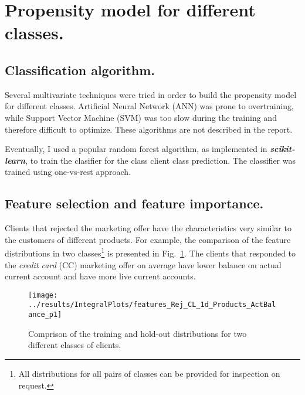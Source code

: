 \documentclass[14pt]{scrartcl}
\begin{document}
\section{Propensity model for different classes.}\label{sec:mva_classifier}
\subsection{Classification algorithm.}
Several multivariate techniques were tried in order to build the propensity model
for different classes.
Artificial Neural Network (ANN) was prone to overtraining, while Support Vector Machine (SVM) 
was too slow during the training and therefore difficult to optimize.
These algorithms are not described in the report.

Eventually, I used a popular random forest algorithm, as implemented in \textbf{\textsl{scikit-learn}},
to train the clasifier for the class client class prediction. The classifier was trained 
using one-vs-rest approach.

\subsection{Feature selection and feature importance.}
Clients that rejected the marketing offer have the characteristics very similar to
the customers of different products. For example, the comparison of the feature distributions
in two classes\footnote{All distributions for all pairs of classes can be provided for inspection on request.}
is presented in Fig.~\ref{fig:input_features_class_comparison}. The 
clients that responded to the \textit{credit card} (CC) marketing offer on average
have lower balance on actual current account and have more live current accounts.
\begin{figure}[htpb!]
    \centering
    \texttt{[image: ../results/IntegralPlots/features\_Rej\_CL\_1d\_Products\_ActBalance\_p1]}\\
    \caption{Comprison of the training and hold-out distributions for two different
    classes of clients.}
    \label{fig:input_features_class_comparison}
 \end{figure}
\end{document}
